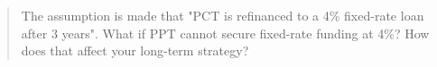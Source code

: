 \documentclass[11pt, a4paper, british]{article}
\begin{document}

\newpage

\begin{quote}
    The assumption is made that "PCT is refinanced to a 4\% fixed-rate loan after 3 years". What if PPT cannot secure fixed-rate funding at 4\%? How does that affect your long-term strategy?
\end{quote}
\end{document}
